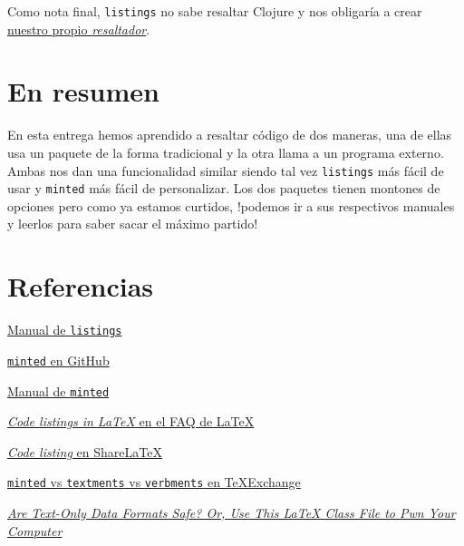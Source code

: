 Como nota final, \lstinline!listings! no sabe resaltar Clojure y nos
obligaría a crear
\href{http://alexott.net/common/clojure/clj-latex.txt}{nuestro propio
\emph{resaltador}}.

\section{En resumen}\label{en-resumen}

En esta entrega hemos aprendido a resaltar código de dos maneras, una de
ellas usa un paquete de la forma tradicional y la otra llama a un
programa externo. Ambas nos dan una funcionalidad similar siendo tal vez
\lstinline!listings! más fácil de usar y \lstinline!minted! más fácil de
personalizar. Los dos paquetes tienen montones de opciones pero como ya
estamos curtidos, !podemos ir a sus respectivos manuales y leerlos para
saber sacar el máximo partido!

\section{Referencias}\label{referencias}

\href{http://www.texdoc.net/texmf-dist/doc/latex/listings/listings.pdf}{Manual
de \lstinline!listings!}

\href{https://github.com/gpoore/minted}{\lstinline!minted! en GitHub}

\href{http://osl.ugr.es/CTAN/macros/latex/contrib/minted/minted.pdf}{Manual
de \lstinline!minted!}

\href{http://www.tex.ac.uk/FAQ-codelist.html}{\emph{Code listings in
LaTeX} en el FAQ de LaTeX}

\href{https://www.sharelatex.com/learn/Code_listing}{\emph{Code listing}
en ShareLaTeX}

\href{https://tex.stackexchange.com/questions/102596/minted-vs-texments-vs-verbments\#103471}{\lstinline!minted!
vs \lstinline!textments! vs \lstinline!verbments! en TeXExchange}

\href{https://www2.cs.uic.edu/~s/papers/tex2010/}{\emph{Are Text-Only
Data Formats Safe? Or, Use This LaTeX Class File to Pwn Your Computer}}
